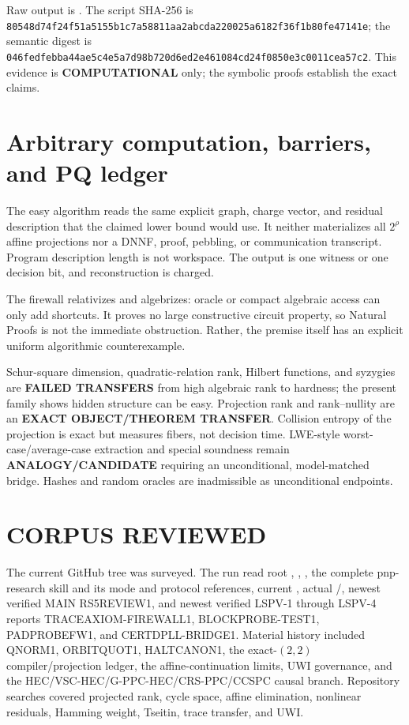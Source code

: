 \documentclass[11pt]{article}
\newcommand{\COMP}{\textbf{COMPUTATIONAL}}
\begin{document}
Raw output is
.
The script SHA-256 is
\texttt{80548d74f24f51a5155b1c7a58811aa2abcda220025a6182f36f1b80fe47141e};
the semantic digest is
\texttt{046fedfebba44ae5c4e5a7d98b720d6ed2e461084cd24f0850e3c0011cea57c2}.
This evidence is \COMP{} only; the symbolic proofs establish the exact claims.

\section{Arbitrary computation, barriers, and PQ ledger}
The easy algorithm reads the same explicit graph, charge vector, and residual
description that the claimed lower bound would use.  It neither materializes
all $2^\rho$ affine projections nor a DNNF, proof, pebbling, or communication
transcript.  Program description length is not workspace.  The output is one
witness or one decision bit, and reconstruction is charged.

The firewall relativizes and algebrizes: oracle or compact algebraic access can
only add shortcuts.  It proves no large constructive circuit property, so
Natural Proofs is not the immediate obstruction.  Rather, the premise itself
has an explicit uniform algorithmic counterexample.

Schur-square dimension, quadratic-relation rank, Hilbert functions, and
syzygies are \textbf{FAILED TRANSFERS} from high algebraic rank to hardness;
the present family shows hidden structure can be easy.  Projection rank and
rank--nullity are an \textbf{EXACT OBJECT/THEOREM TRANSFER}.  Collision entropy
of the projection is exact but measures fibers, not decision time.  LWE-style
worst-case/average-case extraction and special soundness remain
\textbf{ANALOGY/CANDIDATE} requiring an unconditional, model-matched bridge.
Hashes and random oracles are inadmissible as unconditional endpoints.

\section{CORPUS REVIEWED}
The current GitHub tree was surveyed.  The run read root ,
, , the complete pnp-research skill and its mode
and protocol references, current , actual
/, newest verified MAIN RS5REVIEW1, and newest
verified LSPV-1 through LSPV-4 reports TRACEAXIOM-FIREWALL1,
BLOCKPROBE-TEST1, PADPROBEFW1, and CERTDPLL-BRIDGE1.  Material history included
QNORM1, ORBITQUOT1, HALTCANON1, the exact-$(2,2)$ compiler/projection ledger,
the affine-continuation limits, UWI governance, and the
HEC/VSC-HEC/G-PPC-HEC/CRS-PPC/CCSPC causal branch.  Repository searches covered
projected rank, cycle space, affine elimination, nonlinear residuals, Hamming
weight, Tseitin, trace transfer, and UWI.
\end{document}
